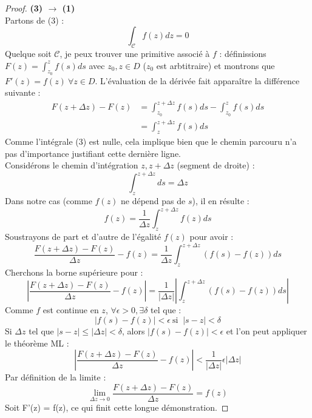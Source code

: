 \begin{proof}
    \textbf{(3) $\rightarrow$ (1)}\\
    Partons de (3) :
    \begin{equation}
    \int_\mathcal{C} f(z) dz = 0
    \end{equation}
    Quelque soit $\mathcal{C}$, je peux trouver une primitive associé à $f$ : 
    définissions $F(z) = \int_{z_0}^{z} f(s) ds$ avec $z_0,z \in D$ ($z_0$ est 
    arbtitraire) et montrons que  $F'(z) = f(z)\ \forall z \in D$. L'évaluation de la
    dérivée fait apparaître la différence suivante :
    \begin{equation}
    \begin{array}{ll}
     F(z+\Delta z) - F(z) &= \int_{z_0}^{z+\Delta z} f(s) ds - \int_{z_0}^z f(s)ds\\
     &= \int_{z}^{z+\Delta z} f(s) ds
    \end{array}
    \end{equation}
    Comme l'intégrale (3) est nulle, cela implique bien que le chemin parcouru n'a pas
    d'importance justifiant cette dernière ligne.\\
    Considérons le chemin d'intégration $z,z+\Delta z$ (segment de droite) :
    \begin{equation}
    \int_z^{z+\Delta z} ds = \Delta z
    \end{equation}
    Dans notre cas (comme $f(z)$ ne dépend pas de $s$), il en résulte :
    \begin{equation}
    f(z) = \frac{1}{\Delta z} \int_z^{z+\Delta z} f(z) ds
    \end{equation}
    Soustrayons de part et d'autre de l'égalité $f(z)$ pour avoir :
    \begin{equation}
    \dfrac{F(z+\Delta z) - F(z)}{\Delta z} - f(z) = \dfrac{1}{\Delta z}\int_z^{z+
    \Delta z} (f(s)-f(z)) ds
    \end{equation}
    Cherchons la borne supérieure pour :
    \begin{equation}
    \left|\dfrac{F(z+\Delta z) - F(z)}{\Delta z} - f(z)\right| = \dfrac{1}{|\Delta z|}
    |\int_z^{z+ \Delta z} (f(s)-f(z)) ds|
    \end{equation}
    Comme $f$ est continue en $z$, $\forall \epsilon > 0, \exists \delta$ tel que :
    \begin{equation}
    |f(s)-f(z)|<\epsilon\ \text{si }\ |s-z| < \delta
    \end{equation}
    Si $\Delta z$ tel que $|s-z|\leq |\Delta z | < \delta$, alors $|f(s)-f(z)|<\epsilon$
     et l'on peut appliquer le théorème ML :
    \begin{equation}
    \left|\dfrac{F(z+\Delta z) - F(z)}{\Delta z} - f(z)\right| < \dfrac{1}{|\Delta z|}
    \epsilon|\Delta z|
    \end{equation}
    Par définition de la limite :
    \begin{equation}
    \lim\limits_{\Delta z \rightarrow 0} \dfrac{F(z+\Delta z) - F(z)}{\Delta z} = f(z)
    \end{equation}
    Soit F'(z) = f(z), ce qui finit cette longue démonstration.
    \end{proof}
